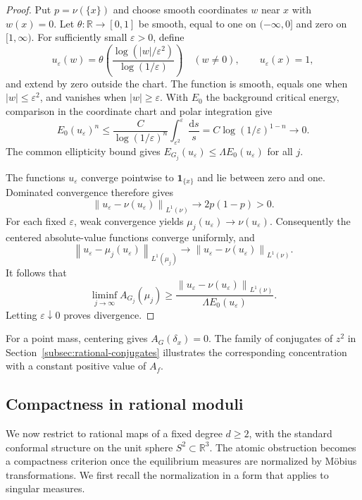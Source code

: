 \documentclass[11pt,reqno]{amsart}
\theoremstyle{plain}
\theoremstyle{definition}
\theoremstyle{remark}
\newcommand{\R}{\mathbb R}
\newcommand{\norm}[1]{\left\lVert #1\right\rVert}
\newcommand{\dd}{\mathrm d}
\numberwithin{equation}{section}
\begin{document}
\begin{proof}
Put $p=\nu(\{x\})$ and choose smooth coordinates $w$ near $x$ with $w(x)=0$. Let $\theta\colon\R\to[0,1]$ be smooth, equal to one on $(-\infty,0]$ and zero on $[1,\infty)$. For sufficiently small $\varepsilon>0$, define
\begin{equation}\label{eq:log-cutoff}
 u_\varepsilon(w)=
 \theta\left(\frac{\log(|w|/\varepsilon^2)}{\log(1/\varepsilon)}\right)
 \quad(w\ne0),\qquad u_\varepsilon(x)=1,
\end{equation}
and extend by zero outside the chart. The function is smooth, equals one when $|w|\le\varepsilon^2$, and vanishes when $|w|\ge\varepsilon$. With $E_0$ the background critical energy, comparison in the coordinate chart and polar integration give
\begin{equation}\label{eq:cutoff-energy}
 E_0(u_\varepsilon)^n
 \le\frac{C}{\log(1/\varepsilon)^n}
        \int_{\varepsilon^2}^{\varepsilon}\frac{\dd s}{s}
 =C\log(1/\varepsilon)^{1-n}\longrightarrow0.
\end{equation}
The common ellipticity bound gives $E_{G_j}(u_\varepsilon)\le\Lambda E_0(u_\varepsilon)$ for all $j$.

The functions $u_\varepsilon$ converge pointwise to $\mathbf1_{\{x\}}$ and lie between zero and one. Dominated convergence therefore gives
\[
 \norm{u_\varepsilon-\nu(u_\varepsilon)}_{L^1(\nu)}
 \longrightarrow 2p(1-p)>0.
\]
For each fixed $\varepsilon$, weak convergence yields $\mu_j(u_\varepsilon)\to\nu(u_\varepsilon)$. Consequently the centered absolute-value functions converge uniformly, and
\[
 \norm{u_\varepsilon-\mu_j(u_\varepsilon)}_{L^1(\mu_j)}
 \longrightarrow
 \norm{u_\varepsilon-\nu(u_\varepsilon)}_{L^1(\nu)}.
\]
It follows that
\[
 \liminf_{j\to\infty}A_{G_j}(\mu_j)
 \ge\frac{\norm{u_\varepsilon-\nu(u_\varepsilon)}_{L^1(\nu)}}
          {\Lambda E_0(u_\varepsilon)}.
\]
Letting $\varepsilon\downarrow0$ proves divergence.
\end{proof}

For a point mass, centering gives $A_G(\delta_x)=0$. The family of conjugates of $z^2$ in Section~\ref{subsec:rational-conjugates} illustrates the corresponding concentration with a constant positive value of $A_f$.

\subsection{Compactness in rational moduli}\label{subsec:moduli}

We now restrict to rational maps of a fixed degree $d\ge2$, with the standard conformal structure on the unit sphere $S^2\subset\R^3$. The atomic obstruction becomes a compactness criterion once the equilibrium measures are normalized by M\"obius transformations. We first recall the normalization in a form that applies to singular measures.
\end{document}
